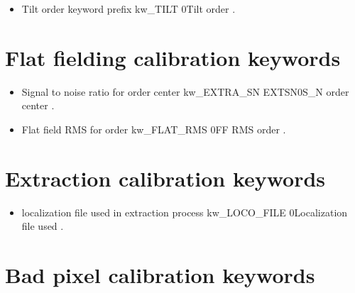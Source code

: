 \begin{itemize}

\item {}
{Tilt order keyword prefix}
{kw\_TILT}
{}{0}{Tilt order}
{\calSLIT}{\spirouKeywords}{\calSLIT.\progMAIN}

\end{itemize}

\section{Flat fielding calibration keywords}
\label{ch:output_keywords:flatfielding}

\begin{itemize}

\item {}
{Signal to noise ratio for order center}
{kw\_EXTRA\_SN}
{EXTSN}{0}{S\_N order center}
{\calFFraw}{\spirouKeywords}{\calFFraw.\progMAIN}


\item {}
{Flat field RMS for order}
{kw\_FLAT\_RMS}
{}{0}{FF RMS order}
{\calFFraw}{\spirouKeywords}{\calFFraw.\progMAIN}

\end{itemize}

\section{Extraction calibration keywords}
\label{ch:output_keywords:extraction}

\begin{itemize}

\item {}
{localization file used in extraction process}
{kw\_LOCO\_FILE}
{}{0}{Localization file used}
{\calextractRAW}{\spirouKeywords}{\calextractRAW.\progMAIN}

\end{itemize}


\section{Bad pixel calibration keywords}
\label{ch:output_keywords:badpix}

